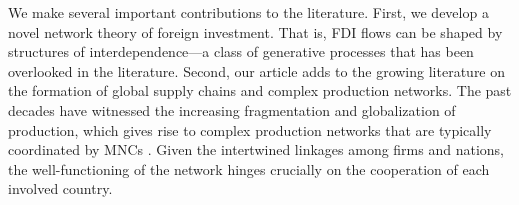 \documentclass[reqno,onecolumn,letterpaper,12pt]{article}
\begin{document}
We make several important contributions to the literature. First, we develop a novel network theory of foreign investment. That is, FDI flows can be shaped by structures of interdependence---a class of generative processes that has been overlooked in the literature. %
Second, our article adds to the growing literature on the formation of global supply chains and complex production networks. The past decades have witnessed the increasing fragmentation and globalization of production, which gives rise to complex production networks that are typically coordinated by MNCs \citep{UNCTAD:2013,Baldwin:2011}. Given the intertwined linkages among firms and nations, the well-functioning of the network hinges crucially on the cooperation of each involved country. %
\end{document}
